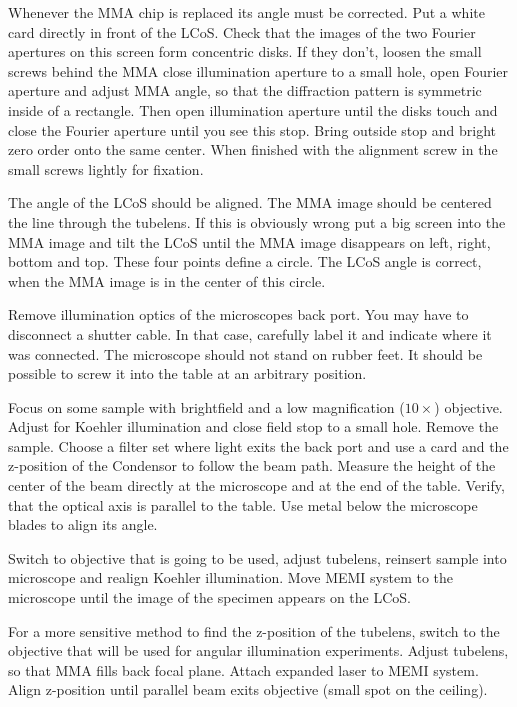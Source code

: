 \documentclass{scrartcl}
\begin{document}
 Whenever the MMA chip is replaced its angle must
be corrected. Put a white card directly in front of the LCoS. Check
that the images of the two Fourier apertures on this screen form
concentric disks. If they don't, loosen the small screws behind the
MMA close illumination aperture to a small hole, open Fourier aperture
and adjust MMA angle, so that the diffraction pattern is symmetric
inside of a rectangle. Then open illumination aperture until the disks
touch and close the Fourier aperture until you see this stop.  Bring
outside stop and bright zero order onto the same center.  When
finished with the alignment screw in the small screws lightly for
fixation.

 The angle of the LCoS should be aligned. The MMA
image should be centered the line through the tubelens. If this is
obviously wrong put a big screen into the MMA image and tilt the LCoS
until the MMA image disappears on left, right, bottom and top. These
four points define a circle. The LCoS angle is correct, when the MMA
image is in the center of this circle.


 Remove illumination optics of the microscopes
back port. You may have to disconnect a shutter cable. In that case,
carefully label it and indicate where it was connected.  The
microscope should not stand on rubber feet. It should be possible to
screw it into the table at an arbitrary position.


 Focus on some sample with
brightfield and a low magnification ($10\times$) objective. Adjust for
Koehler illumination and close field stop to a small hole. Remove the
sample. Choose a filter set where light exits the back port and use a
card and the z-position of the Condensor to follow the beam
path. Measure the height of the center of the beam directly at the
microscope and at the end of the table. Verify, that the optical axis
is parallel to the table. Use metal below the microscope blades to
align its angle.


 Switch to objective that is going
to be used, adjust tubelens, reinsert sample into microscope and
realign Koehler illumination.  Move MEMI system to the microscope
until the image of the specimen appears on the LCoS.

 For a more sensitive
method to find the z-position of the tubelens, switch to the objective
that will be used for angular illumination experiments. Adjust
tubelens, so that MMA fills back focal plane. Attach expanded laser to
MEMI system. Align z-position until parallel beam exits objective
(small spot on the ceiling).
\end{document}
